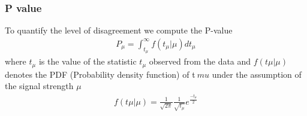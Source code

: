 \documentclass[11pt]{beamer}
\begin{document}
\begin{frame}
\frametitle{P value}
To quantify the level of disagreement we compute the P-value
\begin{align}
P_\mu =\int_{t_\mu}^{\infty}f(t_\mu |\mu) dt_\mu
\end{align}
where $t_\mu$  is the value of the statistic $t_\mu$ observed from the data and $f(t\mu |\mu)$ denotes
the PDF (Probability density function) of t$\	mu$ under the assumption of the signal strength $\mu$\cite{4}
\begin{align}
f(t\mu |\mu)=\frac{1}{\sqrt{2\pi}} \frac{1}{\sqrt{t_\mu}}e^\frac{-t_\mu}{2}
\end{align}
\end{frame}

\end{document}
